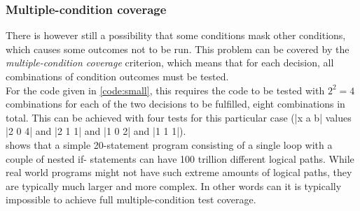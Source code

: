\subsubsection{Multiple-condition coverage}

There is however still a possibility that some conditions mask other
conditions, which causes some outcomes not to be run. This problem can
be covered by the \emph{multiple-condition coverage} criterion, which
means that for each decision, all combinations of condition outcomes
must be tested.\\

For the code given in \ref{code:small}, this requires the code to be
tested with $2^2 = 4$ combinations for each of the two decisions to be
fulfilled, eight combinations in total. This can be achieved with four
tests for this particular case (|x a b| values |2 0 4| and |2 1 1| and
|1 0 2| and |1 1 1|).\\

\citeauthor{book:art_of_testing} shows that a simple 20-statement
program consisting of a single loop with a couple of nested if-
statements can have 100 trillion different logical paths. While real
world programs might not have such extreme amounts of logical paths,
they are typically much larger and more complex. In other words can it
is typically impossible to achieve full multiple-condition test
coverage.\\

